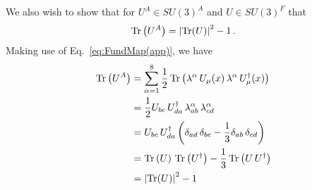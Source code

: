 We also wish to show that for $U^A\in SU(3)^A$ and $U\in SU(3)^F$ that
%
\begin{equation}
\operatorname{Tr}\left(U^A\right) = \left|\operatorname{Tr}(U)\right|^2 -1\, .
\end{equation}
%
Making use of Eq.~\eqref{eq:FundMap(app)}, we have
\begin{align*}
\operatorname{Tr}\left(U^A\right) &= \sum_{\alpha=1}^8 \frac{1}{2}\operatorname{Tr}\left(\lambda^\alpha \, U_\mu(x) \, \lambda^\alpha \, U_\mu^\dagger(x)\right)\\
&= \frac{1}{2}U_{bc} \, U^\dagger_{da} \, \lambda_{ab}^\alpha \, \lambda_{cd}^\alpha\\
&= U_{bc} \, U^\dagger_{da} \left(\delta_{ad}\,\delta_{bc} - \frac{1}{3}\delta_{ab}\,\delta_{cd}\right)\\
&= \operatorname{Tr}\left(U\right) \, \operatorname{Tr}\left( U^\dagger \right) - \frac{1}{3}\operatorname{Tr}\left(U\, U^\dagger\right)\\
&= \left|\operatorname{Tr}(U)\right|^2 -1
\end{align*}

